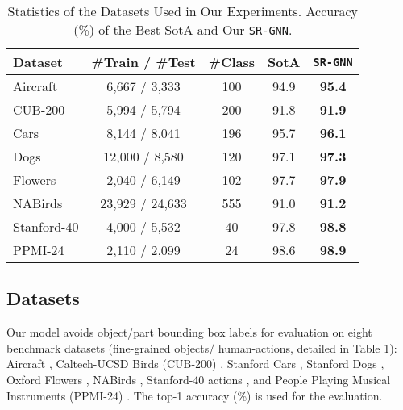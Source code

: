 \documentclass[journal]{IEEEtran}
\begin{document}
\begin{table}
\begin{center}
 \caption{Statistics of the Datasets Used in Our Experiments. Accuracy (\%) of the Best SotA and Our \texttt{SR-GNN}.  }
 \label{table:overall_accuracy}
\begin{tabular}{|l| c c c c|}
 \hline
Dataset &  \#Train / \#Test & \#Class & SotA & \texttt{SR-GNN} \\
    \hline
Aircraft & 6,667 / 3,333 &100 &94.9 \cite{behera2021context}  & \textbf{95.4} \\ 
CUB-200 & 5,994 / 5,794 &200 &91.8 \cite{behera2021context} &\textbf{91.9} \\ 
Cars & 8,144 / 8,041 &196 & 95.7 \cite{behera2021context} &\textbf{96.1} \\ 
 Dogs & 12,000 / 8,580 &120 &97.1\cite{ge2019weakly} &\textbf{97.3} \\ Flowers & 2,040 / 6,149 &102  &97.7 \cite{chang2020devil} &\textbf{97.9} \\ 
NABirds &23,929 / 24,633 &555 &91.0 \cite{behera2021context} &\textbf{91.2} \\
\hline
Stanford-40 & 4,000 / 5,532 &40 &97.8 \cite{bera2021attend} &\textbf{98.8} \\
PPMI-24 & 2,110 / 2,099 &24 &98.6 \cite{behera2020regional} &\textbf{98.9} \\

\hline
\end{tabular}
\end{center}
 \vspace{-0.5cm}
\end{table}
\subsection {Datasets}
Our model avoids object/part bounding box labels for evaluation on eight benchmark datasets (fine-grained objects/ human-actions, detailed in Table \ref{table:overall_accuracy}): Aircraft \cite{maji2013fine}, Caltech-UCSD Birds (CUB-200) \cite{wah2011caltech}, Stanford Cars \cite{krause20133d}, Stanford Dogs \cite{khosla2011novel}, Oxford Flowers  \cite{nilsback2008automated},  NABirds \cite{van2015building}, Stanford-40 actions \cite{yao2011human}, and People Playing Musical Instruments (PPMI-24) \cite{yao2010grouplet}. The top-1 accuracy (\%) is used for the evaluation. 
\end{document}
